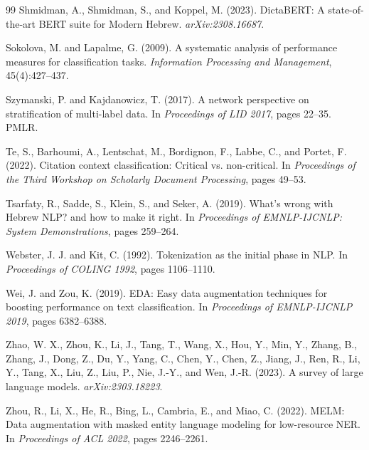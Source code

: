 \documentclass[12pt,a4paper]{report}
\begin{document}
\begin{thebibliography}{99}
Shmidman, A., Shmidman, S., and Koppel, M. (2023).
DictaBERT: A state-of-the-art BERT suite for Modern Hebrew.
\emph{arXiv:2308.16687}.

Sokolova, M. and Lapalme, G. (2009).
A systematic analysis of performance measures for classification tasks.
\emph{Information Processing and Management}, 45(4):427--437.

Szymanski, P. and Kajdanowicz, T. (2017).
A network perspective on stratification of multi-label data.
In \emph{Proceedings of LID 2017}, pages 22--35. PMLR.

Te, S., Barhoumi, A., Lentschat, M., Bordignon, F., Labbe, C., and Portet, F. (2022).
Citation context classification: Critical vs. non-critical.
In \emph{Proceedings of the Third Workshop on Scholarly Document Processing}, pages 49--53.

Tsarfaty, R., Sadde, S., Klein, S., and Seker, A. (2019).
What's wrong with Hebrew NLP? and how to make it right.
In \emph{Proceedings of EMNLP-IJCNLP: System Demonstrations}, pages 259--264.

Webster, J. J. and Kit, C. (1992).
Tokenization as the initial phase in NLP.
In \emph{Proceedings of COLING 1992}, pages 1106--1110.

Wei, J. and Zou, K. (2019).
EDA: Easy data augmentation techniques for boosting performance on text classification.
In \emph{Proceedings of EMNLP-IJCNLP 2019}, pages 6382--6388.

Zhao, W. X., Zhou, K., Li, J., Tang, T., Wang, X., Hou, Y., Min, Y., Zhang, B., Zhang, J., Dong, Z., Du, Y., Yang, C., Chen, Y., Chen, Z., Jiang, J., Ren, R., Li, Y., Tang, X., Liu, Z., Liu, P., Nie, J.-Y., and Wen, J.-R. (2023).
A survey of large language models.
\emph{arXiv:2303.18223}.

Zhou, R., Li, X., He, R., Bing, L., Cambria, E., and Miao, C. (2022).
MELM: Data augmentation with masked entity language modeling for low-resource NER.
In \emph{Proceedings of ACL 2022}, pages 2246--2261.

\end{thebibliography}
\end{document}

